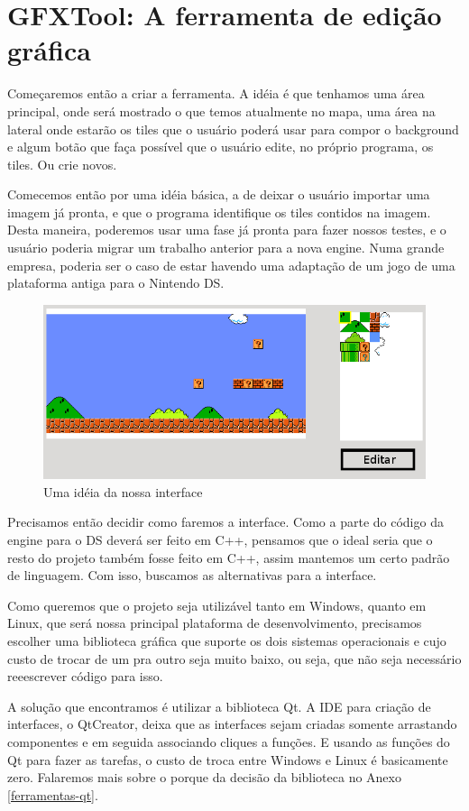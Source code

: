 \documentclass[brazil]{abnt}
\begin{document}
\section{GFXTool: A ferramenta de edição gráfica}
Começaremos então a criar a ferramenta. A idéia é que tenhamos uma área principal, onde será mostrado o que temos atualmente no mapa, uma área na lateral onde estarão os tiles que o usuário poderá usar para compor o background e algum botão que faça possível que o usuário edite, no próprio programa, os tiles. Ou crie novos.

Comecemos então por uma idéia básica, a de deixar o usuário importar uma imagem já pronta, e que o programa identifique os tiles contidos na imagem. Desta maneira, poderemos usar uma fase já pronta para fazer nossos testes, e o usuário poderia migrar um trabalho anterior para a nova engine. Numa grande empresa, poderia ser o caso de estar havendo uma adaptação de um jogo de uma plataforma antiga para o Nintendo DS.

\begin{figure}[h]
\includegraphics[width=\linewidth]{imgs/mockup.png}
\caption{Uma idéia da nossa interface} 
\end{figure}

Precisamos então decidir como faremos a interface. Como a parte do código da engine para o DS deverá ser feito em C++, pensamos que o ideal seria que o resto do projeto também fosse feito em C++, assim mantemos um certo padrão de linguagem. Com isso, buscamos as alternativas para a interface.

Como queremos que o projeto seja utilizável tanto em Windows, quanto em Linux, que será nossa principal plataforma de desenvolvimento, precisamos escolher uma biblioteca gráfica que suporte os dois sistemas operacionais e cujo custo de trocar de um pra outro seja muito baixo, ou seja, que não seja necessário reeescrever código para isso.

A solução que encontramos é utilizar a biblioteca Qt. A IDE para criação de interfaces, o QtCreator, deixa que as interfaces sejam criadas somente arrastando componentes e em seguida associando cliques a funções. E usando as funções do Qt para fazer as tarefas, o custo de troca entre Windows e Linux é basicamente zero. Falaremos mais sobre o porque da decisão da biblioteca no Anexo \ref{ferramentas-qt}.
\end{document}
